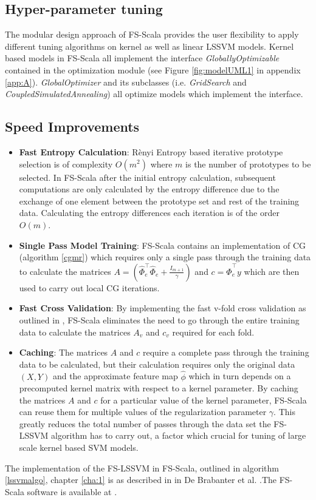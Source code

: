 \subsection{Hyper-parameter tuning}
The modular design approach of FS-Scala provides the user flexibility to apply different tuning algorithms on kernel as well as linear LSSVM models. Kernel based models in FS-Scala all implement the interface \textit{GloballyOptimizable} contained in the optimization module (see Figure \ref{fig:modelUML1} in appendix \ref{app:A}). \textit{GlobalOptimizer} and its subclasses (i.e. \textit{GridSearch} and \textit{CoupledSimulatedAnnealing}) all optimize models which implement the  interface.

\subsection{Speed Improvements}
\begin{itemize}
\item \textbf{Fast Entropy Calculation}:
R\`enyi Entropy based iterative prototype selection is of complexity $O(m^2)$ where $m$ is the number of prototypes to be selected. In FS-Scala after the initial entropy calculation, subsequent computations are only calculated by the entropy difference due to the exchange of one element between the prototype set and rest of the training data. Calculating the entropy differences each iteration is of the order $O(m)$.

\item \textbf{Single Pass Model Training}: 
FS-Scala contains an implementation of CG (algorithm  \ref{cgmr}) which requires only a single pass through the training data to calculate the matrices $A = \left (\hat{\Phi}^{\intercal}_e \hat{\Phi}_e + \frac{\mathit{I}_{m+1}}{\gamma} \right )$ and $c = \hat{\Phi}^{\intercal}_e y$ which are then used to carry out local CG iterations.

\item \textbf{Fast Cross Validation}:
By implementing the fast v-fold cross validation as outlined in \cite{DeBrabanter2010}, FS-Scala eliminates the need to go through the entire training data to calculate the matrices $A_v$ and $c_v$ required for each fold.

\item \textbf{Caching}:
The matrices $A$ and $c$ require a complete pass through the training data to be calculated, but their calculation requires only the original data $(X, Y)$ and the approximate feature map $\hat{\phi}$ which in turn depends on a precomputed kernel matrix with respect to a kernel parameter. By caching the matrices $A$ and $c$ for a particular value of the kernel parameter, FS-Scala can reuse them for multiple values of the regularization parameter $\gamma$. This greatly reduces the total number of passes through the data set the FS-LSSVM algorithm has to carry out, a factor which crucial for tuning of large scale kernel based SVM models.

\end{itemize}

The implementation of the FS-LSSVM in FS-Scala, outlined in algorithm \ref{lssvmalgo}, chapter \ref{cha:1} is as described in in De Brabanter et al. \cite{DeBrabanter2010}.The FS-Scala software is available at \cite{fsscala}.